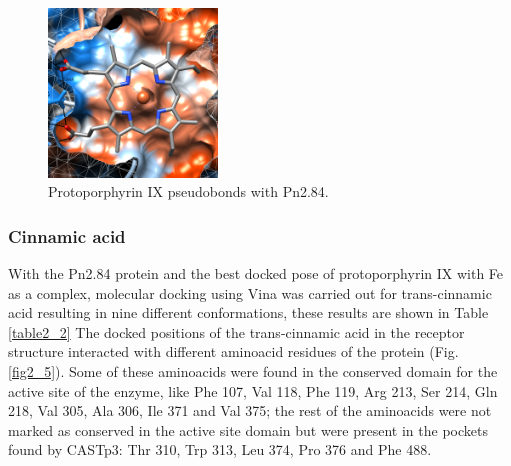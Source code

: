 \documentclass[12pt]{article}
\begin{document}
	\FloatBarrier
	
	\FloatBarrier
	\begin{figure}[h!]
		\centering
		\includegraphics[width=0.4\textwidth]{../2/Dock/chimera.png}
		\caption{\centering Protoporphyrin IX pseudobonds with Pn2.84.}
		\label{fig2_4}
	\end{figure}
	\FloatBarrier
	
	
	\subsubsection{Cinnamic acid}
	
	With the Pn2.84 protein and the best docked pose of protoporphyrin IX with Fe as a complex, molecular docking using Vina was carried out for trans-cinnamic acid resulting in nine different conformations, these results are shown in Table \ref{table2_2} The docked positions of the trans-cinnamic acid in the receptor structure interacted with different aminoacid residues of the protein (Fig. \ref{fig2_5}). Some of these aminoacids were found in the conserved domain for the active site of the enzyme, like Phe 107, Val 118, Phe 119, Arg 213, Ser 214, Gln 218, Val 305, Ala 306, Ile 371 and Val 375; the rest of the aminoacids were not marked as conserved in the active site domain but were present in the pockets found by CASTp3: Thr 310, Trp 313, Leu 374, Pro 376 and Phe 488.
	
\end{document}
